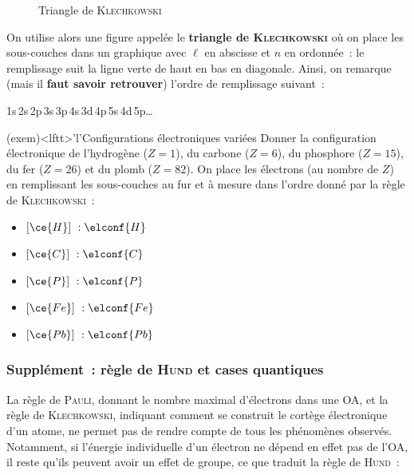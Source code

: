 \documentclass[../../main/main.tex]{subfiles}
\begin{document}
\begin{tcb*}
\begin{minipage}{0.45\linewidth}
\begin{figure}[H]
			\caption{Triangle de \textsc{Klechkowski}}
			\label{fig:klech}
		\end{figure}
	\end{minipage}
	\hfill
	\begin{minipage}{0.45\linewidth}
		On utilise alors une figure appelée le \textbf{triangle de
			\textsc{Klechkowski}} où on place les sous-couches dans un graphique avec
		$\ell$ en abscisse et $n$ en ordonnée~: le remplissage suit la ligne verte
		de haut en bas en diagonale. \bigbreak
		Ainsi, on remarque (mais il \textbf{faut savoir retrouver}) l'ordre de
		remplissage suivant~:
		\begin{center}
			1s\,2s\,2p\,3s\,3p\,4s\,3d\,4p\,5s\,4d\,5p…
		\end{center}
	\end{minipage}
\end{tcb*}

\begin{tcb*}[breakable](exem)<lftt>'l'{Configurations électroniques variées}
	Donner la configuration électronique de l'hydrogène ($Z = 1$), du carbone
	($Z = 6$), du phosphore ($Z = 15$), du fer ($Z=26$) et du plomb ($Z=82$).
	\tcblower
	On place les électrons (au nombre de $Z$) en remplissant les sous-couches au
	fur et à mesure dans l'ordre donné par la règle de \textsc{Klechkowski}~:
	\begin{itemize}[label=$\diamond$, leftmargin=20pt]
		\item $[\ce{H}]~: \elconf{H}$
		\item $[\ce{C}]~: \elconf{C}$
		\item $[\ce{P}]~: \elconf{P}$
		\item $[\ce{Fe}]~: \elconf{Fe}$
		\item $[\ce{Pb}]~: \elconf{Pb}$
	\end{itemize}
\end{tcb*}

\subsubsection{Supplément~: règle de \textsc{Hund} et cases quantiques}
La règle de \textsc{Pauli}, donnant le nombre maximal d'électrons dans une OA,
et la règle de \textsc{Klechkowski}, indiquant comment se construit le cortège
électronique d'un atome, ne permet pas de rendre compte de tous les phénomènes
observés. Notamment, si l'énergie individuelle d'un électron ne dépend en effet
pas de l'OA, il reste qu'ils peuvent avoir un effet de groupe, ce que traduit la
règle de \textsc{Hund}~:
\end{document}
